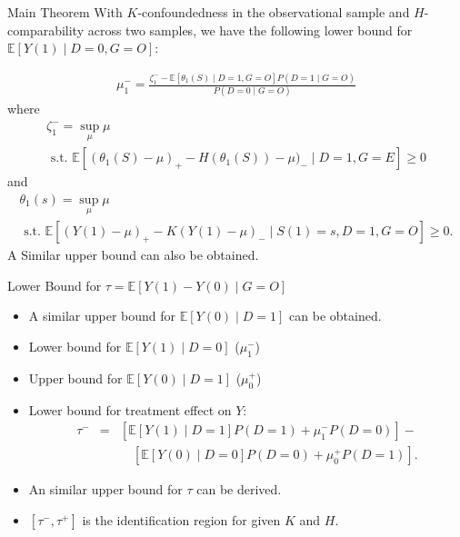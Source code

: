 \documentclass{beamer}					%
\newcommand{\Ep}{\mathbb{E}}
\begin{document}
\begin{frame}{Main Theorem}
    With $K$-confoundedness in the observational sample and $H$-comparability across two samples, we have the following lower bound for $\Ep[Y(1) \mid D = 0, G = O]$:
			
			\begin{equation*}
			\begin{array}{ll}
			\mu_1^- =  \frac{\zeta_1^- - \Ep[\theta_1(S) \mid D=1, G=O] P(D=1\mid G=O)}{P(D = 0 \mid G = O)}
			\end{array}
			\end{equation*}
			where 
			\begin{equation*}
			\begin{array}{ll}
			\zeta_1^- =  \sup _{\mu}  \mu \\
			 \text { s.t. }   \mathbb{E}\left[(\theta_1(S)-\mu)_{+}-H(\theta_1(S))-\mu)_{-} \mid D=1, G = E\right] \geq 0
			\end{array}
			\end{equation*}
			and
			\begin{equation*}
			\begin{array}{ll}
			\theta_1(s) =  \sup _{\mu}  \mu \\
			\text { s.t. }   \mathbb{E}\left[(Y(1)-\mu)_{+}-K(Y(1)-\mu)_{-} \mid S(1)=s, D=1, G = O\right] \geq 0.
			\end{array}
		\end{equation*}
		A Similar upper bound can also be obtained.
\end{frame}

\begin{frame}{Lower Bound for $\tau = \Ep[Y(1)-Y(0) \mid G = O]$}
    \begin{itemize}
        \item A similar upper bound for $\Ep[Y(0) \mid D = 1]$ can be obtained.
        \item Lower bound for $\Ep[Y(1) \mid D = 0]$ ($\mu_1^-$)
        \item Upper bound for $\Ep[Y(0) \mid D = 1]$ ($\mu_0^+$)
        \item Lower bound for treatment effect on $Y$:
	\begin{eqnarray*}
		\tau^-  & = & \left[\Ep[Y(1) \mid D = 1]P(D = 1) + \mu_1^-  P(D = 0)\right] - \\
		 & & \quad \left[\Ep[Y(0) \mid D = 0]P(D = 0) + \mu_0^+ P(D = 1)\right].
	\end{eqnarray*}
	\item An similar upper bound for $\tau$ can be derived.
	\item $[\tau^-, \tau^+]$ is the identification region for given $K$ and $H$.
    \end{itemize}
\end{frame}
\end{document}
